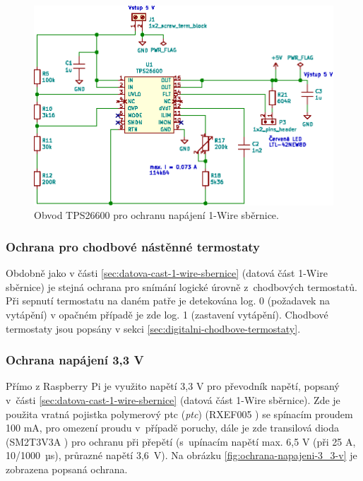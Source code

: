 \begin{figure}[H]
    \centering
    \includegraphics[width=\textwidth]{images/svg/kicad/ochrana-napajeni-1-wire.eps}
    \caption{Obvod TPS26600 pro ochranu napájení 1-Wire sběrnice.}
    \label{fig:ochrana-napajeni-1-wire}
\end{figure}

\subsubsection{Ochrana pro chodbové nástěnné termostaty}
Obdobně jako v části \ref{sec:datova-cast-1-wire-sbernice} (datová část 1-Wire sběrnice) je stejná ochrana pro snímání logické úrovně z~chodbových termostatů. Při sepnutí termostatu na daném patře je detekována log. 0 (požadavek na vytápění) v opačném případě je zde log. 1 (zastavení vytápění). Chodbové  termostaty jsou popsány v sekci \ref{sec:digitalni-chodbove-termostaty}.

\subsubsection{Ochrana napájení 3,3 V}
Přímo z Raspberry Pi je využito napětí 3,3 V pro převodník napětí, popsaný v~části \ref{sec:datova-cast-1-wire-sbernice} (datová část 1-Wire sběrnice). Zde je použita vratná pojistka polymerový \acrshort{ptc} (\textit{\acrlong{ptc}}) (RXEF005 \cite{rxef005}) se spínacím proudem 100 mA, pro omezení proudu v~případě poruchy, dále je zde transilová dioda (SM2T3V3A \cite{sm2t3v3a}) pro ochranu při přepětí (s~upínacím napětí max. 6,5 V (při 25 A, 10/1000~µs), průrazné napětí 3,6~V). Na obrázku \ref{fig:ochrana-napajeni-3_3-v} je zobrazena popsaná ochrana.


